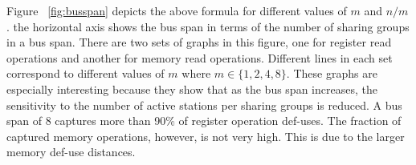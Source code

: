 \documentclass[10pt,twocolumn]{IEEEtran}
\begin{document}
%
%

Figure ~\ref{fig:busspan} depicts the above formula for different values of
$m$ and $n/m$. the horizontal axis shows the bus span in terms of the number of
sharing groups in a bus span.  There are two sets of graphs in this figure,
one for register read operations and another for memory read operations.
Different lines in each set correspond to different values of
$m$ where \mbox{$m \in \{1,2,4,8\}$}.  
These graphs are especially interesting because they show that as the
bus span increases, the sensitivity to the number of active stations
per sharing groups is reduced.  A bus span of 8 captures more than 90\%
of register operation def-uses.  The fraction of captured memory
operations, however, is not very high.  This is due to the larger
memory def-use distances.

%
%
\end{document}
